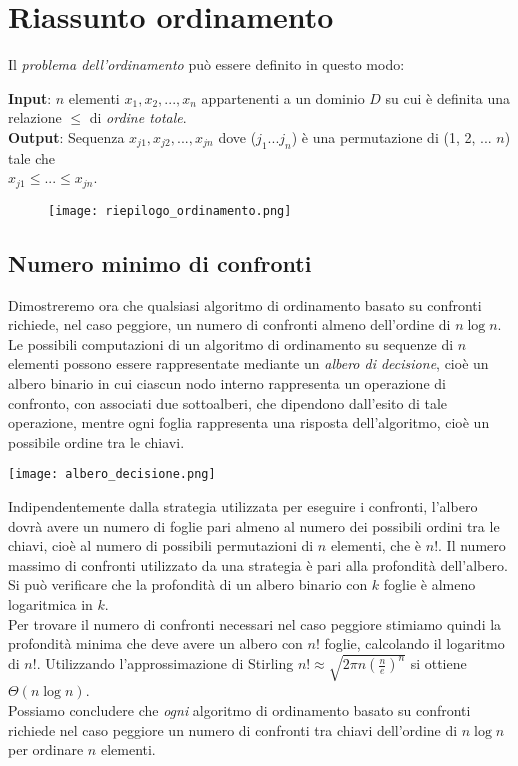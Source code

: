 \section{Riassunto ordinamento}
Il \emph{problema dell'ordinamento} può essere definito in questo modo:

\noindent \textbf{Input}: $n$ elementi $x_1, x_2, ... , x_n$ appartenenti a un dominio $D$ su cui
è definita una relazione $\le$ di \emph{ordine totale}.\\[15pt]
\textbf{Output}: Sequenza $x_{j1}, x_{j2}, ..., x_{jn}$ dove ($j_1...j_n$) 
è una permutazione di (1, 2, ... $n$) tale che\\ $x_{j1} \le ... \le x_{jn}$.

\begin{figure}[h]
    \texttt{[image: riepilogo\_ordinamento.png]}
\end{figure}


\subsection{Numero minimo di confronti}
Dimostreremo ora che qualsiasi algoritmo di ordinamento basato su confronti 
richiede, nel caso peggiore, un numero di confronti almeno dell'ordine di $n \log n$.
Le possibili computazioni di un algoritmo di ordinamento su sequenze di $n$ elementi 
possono essere rappresentate mediante un \emph{albero di decisione}, cioè un albero
binario in cui ciascun nodo interno rappresenta un operazione di confronto, con associati due 
sottoalberi, che dipendono dall'esito di tale operazione, mentre ogni foglia rappresenta 
una risposta dell'algoritmo, cioè un possibile ordine tra le chiavi.

\begin{center}
    \texttt{[image: albero\_decisione.png]}
\end{center}
\clearpage
\noindent Indipendentemente dalla strategia utilizzata per eseguire i confronti, l'albero dovrà avere un
numero di foglie pari almeno al numero dei possibili ordini tra le chiavi, cioè
al numero di possibili permutazioni di $n$ elementi, che è $n!$. Il numero massimo
di confronti utilizzato da una strategia è pari alla profondità dell'albero.
Si può verificare che la profondità di un albero binario con $k$ foglie è
almeno logaritmica in $k$.\\
Per trovare il numero di confronti necessari nel caso peggiore stimiamo quindi 
la profondità minima che deve avere un albero con $n!$ foglie, calcolando il logaritmo di $n!$.
Utilizzando l'approssimazione di Stirling $n! \approx \sqrt{2 \pi n (\frac{n}{e})^n}$ si ottiene $\Theta(n \log n)$.\\
Possiamo concludere che \emph{ogni} algoritmo di ordinamento basato su confronti richiede nel caso peggiore 
un numero di confronti tra chiavi dell'ordine di $n \log n$ per ordinare $n$ elementi.
\clearpage
